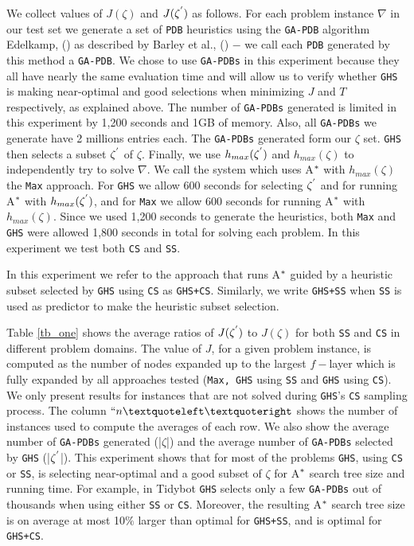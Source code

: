 We collect values of $J(\zeta)$ and $J(\zeta\sp{'})$ as follows. For each problem instance $\nabla$ in our test set we generate a set of \texttt{PDB} heuristics using the \texttt{GA-PDB} algorithm Edelkamp, (\citeyear{edelkamp2007automated}) as described by Barley et al., (\citeyear{BarleySantiagoOver}) $-$ we call each \texttt{PDB} generated by this method a \texttt{GA-PDB}. We chose to use \texttt{GA-PDBs} in this experiment because they all have nearly the same evaluation time and will allow us to verify whether \texttt{GHS} is making near-optimal and good selections when minimizing $J$ and $T$ respectively, as explained above. The number of \texttt{GA-PDBs} generated is limited in this experiment by 1,200 seconds and 1GB of memory. Also, all \texttt{GA-PDBs} we generate have 2 millions entries each. The \texttt{GA-PDBs} generated form our $\zeta$ set. \texttt{GHS} then selects a subset $\zeta\sp{'}$ of $\zeta$. Finally, we use $h_{max}(\zeta\sp{'})$ and $h_{max}(\zeta)$ to independently try to solve $\nabla$. We call the system which uses A$\sp{*}$ with $h_{max}(\zeta)$ the \texttt{Max} approach. For \texttt{GHS} we allow 600 seconds for selecting $\zeta\sp{'}$ and for running A$\sp{*}$ with $h_{max}(\zeta\sp{'})$, and for \texttt{Max} we allow 600 seconds for running A$\sp{*}$ with $h_{max}(\zeta)$. Since we used 1,200 seconds to generate the heuristics, both \texttt{Max} and \texttt{GHS} were allowed 1,800 seconds in total for solving each problem. In this experiment we test both \texttt{CS} and \texttt{SS}.

In this experiment we refer to the approach that runs A$\sp{*}$ guided by a heuristic subset selected by \texttt{GHS} using \texttt{CS} as \texttt{GHS+CS}. Similarly, we write \texttt{GHS+SS} when \texttt{SS} is used as predictor to make the heuristic subset selection.

Table \ref{tb_one} shows the average ratios of $J(\zeta\sp{'})$ to $J(\zeta)$ for both \texttt{SS} and \texttt{CS} in different problem domains. The value of $J$, for a given problem instance, is computed as the number of nodes expanded up to the largest $f-$layer which is fully expanded by all approaches tested (\texttt{Max, GHS} using \texttt{SS} and \texttt{GHS} using \texttt{CS}). We only present results for instances that are not solved during \texttt{GHS}'s \texttt{CS} sampling process. The column $``n‘’$ shows the number of instances used to compute the averages of each row. We also show the average number of \texttt{GA-PDBs} generated (|$\zeta$|) and the average number of \texttt{GA-PDBs} selected by \texttt{GHS} (|$\zeta\sp{'}$|). This experiment shows that for most of the problems \texttt{GHS}, using \texttt{CS} or \texttt{SS}, is selecting near-optimal and a good subset of $\zeta$ for A$\sp{*}$ search tree size and running time. For example, in Tidybot \texttt{GHS} selects only a few \texttt{GA-PDBs} out of thousands when using either \texttt{SS} or \texttt{CS}. Moreover, the resulting A$\sp{*}$ search tree size is on average at most 10$\%$ larger than optimal for \texttt{GHS+SS}, and is optimal for \texttt{GHS+CS}.

